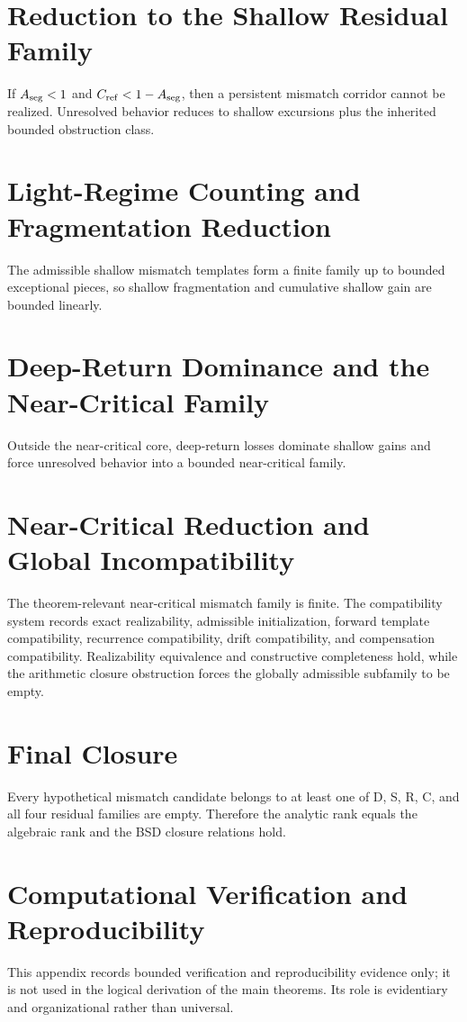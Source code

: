 \documentclass[11pt,a4paper]{article}
\begin{document}
\section{Reduction to the Shallow Residual Family}
If \(A_{\rm seg} < 1\) and \(C_{\rm ref} < 1 - A_{\rm seg}\), then a persistent mismatch corridor cannot be realized. Unresolved behavior reduces to shallow excursions plus the inherited bounded obstruction class.

\section{Light-Regime Counting and Fragmentation Reduction}
The admissible shallow mismatch templates form a finite family up to bounded exceptional pieces, so shallow fragmentation and cumulative shallow gain are bounded linearly.

\section{Deep-Return Dominance and the Near-Critical Family}
Outside the near-critical core, deep-return losses dominate shallow gains and force unresolved behavior into a bounded near-critical family.

\section{Near-Critical Reduction and Global Incompatibility}
The theorem-relevant near-critical mismatch family is finite. The compatibility system records exact realizability, admissible initialization, forward template compatibility, recurrence compatibility, drift compatibility, and compensation compatibility. Realizability equivalence and constructive completeness hold, while the arithmetic closure obstruction forces the globally admissible subfamily to be empty.

\section{Final Closure}
Every hypothetical mismatch candidate belongs to at least one of D, S, R, C, and all four residual families are empty. Therefore the analytic rank equals the algebraic rank and the BSD closure relations hold.

\appendix
\section{Computational Verification and Reproducibility}
This appendix records bounded verification and reproducibility evidence only; it is not used in the logical derivation of the main theorems. Its role is evidentiary and organizational rather than universal.
\end{document}
